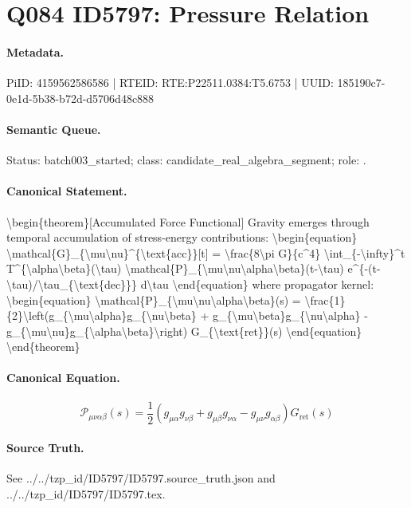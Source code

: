 \section*{Q084 ID5797: Pressure Relation}
\paragraph{Metadata.}
PiID: 4159562586586 | RTEID: RTE:P22511.0384:T5.6753 | UUID: 185190c7-0e1d-5b38-b72d-d5706d48c888

\paragraph{Semantic Queue.}
Status: batch003\_started; class: candidate\_real\_algebra\_segment; role: .

\paragraph{Canonical Statement.}
\textbackslash{}begin\{theorem\}[Accumulated Force Functional] Gravity emerges through temporal accumulation of stress-energy contributions: \textbackslash{}begin\{equation\} \textbackslash{}mathcal\{G\}\_\{\textbackslash{}mu\textbackslash{}nu\}\textasciicircum{}\{\textbackslash{}text\{acc\}\}[t] = \textbackslash{}frac\{8\textbackslash{}pi G\}\{c\textasciicircum{}4\} \textbackslash{}int\_\{-\textbackslash{}infty\}\textasciicircum{}t T\textasciicircum{}\{\textbackslash{}alpha\textbackslash{}beta\}(\textbackslash{}tau) \textbackslash{}mathcal\{P\}\_\{\textbackslash{}mu\textbackslash{}nu\textbackslash{}alpha\textbackslash{}beta\}(t-\textbackslash{}tau) e\textasciicircum{}\{-(t-\textbackslash{}tau)/\textbackslash{}tau\_\{\textbackslash{}text\{dec\}\}\} d\textbackslash{}tau \textbackslash{}end\{equation\} where propagator kernel: \textbackslash{}begin\{equation\} \textbackslash{}mathcal\{P\}\_\{\textbackslash{}mu\textbackslash{}nu\textbackslash{}alpha\textbackslash{}beta\}(s) = \textbackslash{}frac\{1\}\{2\}\textbackslash{}left(g\_\{\textbackslash{}mu\textbackslash{}alpha\}g\_\{\textbackslash{}nu\textbackslash{}beta\} + g\_\{\textbackslash{}mu\textbackslash{}beta\}g\_\{\textbackslash{}nu\textbackslash{}alpha\} - g\_\{\textbackslash{}mu\textbackslash{}nu\}g\_\{\textbackslash{}alpha\textbackslash{}beta\}\textbackslash{}right) G\_\{\textbackslash{}text\{ret\}\}(s) \textbackslash{}end\{equation\} \textbackslash{}end\{theorem\}

\paragraph{Canonical Equation.}
\[
\begin{equation} \mathcal{P}_{\mu\nu\alpha\beta}(s) = \frac{1}{2}\left(g_{\mu\alpha}g_{\nu\beta} + g_{\mu\beta}g_{\nu\alpha} - g_{\mu\nu}g_{\alpha\beta}\right) G_{\text{ret}}(s) \end{equation}
\]

\paragraph{Source Truth.}
See ../../tzp\_id/ID5797/ID5797.source\_truth.json and ../../tzp\_id/ID5797/ID5797.tex.
